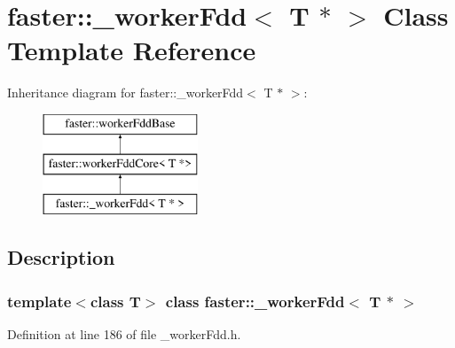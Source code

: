 \hypertarget{classfaster_1_1__workerFdd_3_01T_01_5_01_4}{}\section{faster\+:\+:\+\_\+worker\+Fdd$<$ T $\ast$ $>$ Class Template Reference}
\label{classfaster_1_1__workerFdd_3_01T_01_5_01_4}
Inheritance diagram for faster\+:\+:\+\_\+worker\+Fdd$<$ T $\ast$ $>$\+:\begin{figure}[H]
\begin{center}
\leavevmode
\includegraphics[height=3.000000cm]{classfaster_1_1__workerFdd_3_01T_01_5_01_4}
\end{center}
\end{figure}


\subsection{Description}
\subsubsection*{template$<$class T$>$\newline
class faster\+::\+\_\+worker\+Fdd$<$ T $\ast$ $>$}



Definition at line 186 of file \+\_\+worker\+Fdd.\+h.

